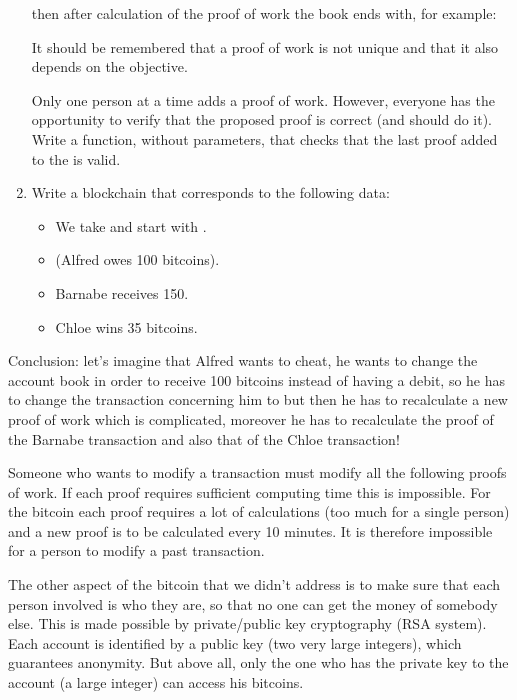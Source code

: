 \documentclass[11pt,class=report,crop=false]{standalone}
\begin{document}
\begin{activite}
\begin{enumerate}
  then after calculation of the proof of work the book ends with, for example:  
  
     It should be remembered that a proof of work is not unique and that it also depends on the  objective.
   
   Only one person at a time adds a proof of work. However, everyone has the opportunity to verify that the proposed proof is correct (and should do it). 
	Write a  function, without parameters, that checks that the last proof added to the  is valid.
	
	\item Write a blockchain that corresponds to the following data:
	\begin{itemize}
	  \item We take  and start with .
	  \item {} (Alfred owes 100 bitcoins).
	  \item Barnabe receives 150.
	  \item Chloe wins 35 bitcoins.
	\end{itemize}

\end{enumerate} 


Conclusion: let's imagine that Alfred wants to cheat, he wants to change the account book in order to receive 100 bitcoins instead of having a debit, so he has to change the transaction concerning him to  but then he has to recalculate a new proof of work which is complicated, moreover he has to recalculate the proof of the Barnabe transaction and also that of the Chloe transaction! 

Someone who wants to modify a transaction must modify all the following proofs of work. If each proof requires sufficient computing time this is impossible. For the bitcoin each proof requires a lot of calculations (too much for a single person) and a new proof is to be calculated every 10 minutes. It is therefore impossible for a person to modify a past transaction.

\end{activite}


The other aspect of the bitcoin that we didn't address is to make sure that each person involved is who they are, so that no one can get the money of somebody else. This is made possible by private/public key cryptography (RSA system). Each account is identified by a public key (two very large integers), which guarantees anonymity. But above all, only the one who has the private key to the account (a large integer) can access his bitcoins.
\end{document}
